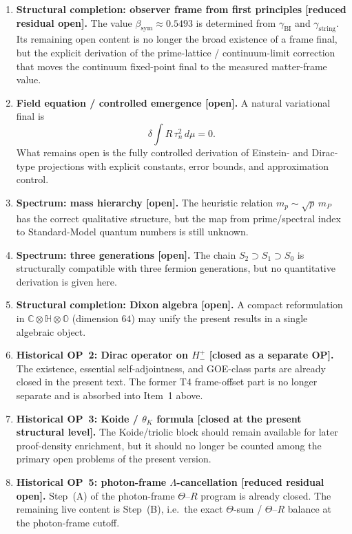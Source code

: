 \documentclass[12pt,a4paper]{article}
\newcommand{\Hplusminus}{H^+_-}
\begin{document}
\begin{enumerate}
 \item \textbf{Structural completion: observer frame from first principles}
 \textbf{[reduced residual open].}
 The value $\beta_{\mathrm{sym}} \approx 0.5493$ is determined from
 $\gamma_{\mathrm{BI}}$ and $\gamma_{\mathrm{string}}$. Its remaining
 open content is no longer the broad existence of a frame final,
 but the explicit derivation of the prime-lattice / continuum-limit
 correction that moves the continuum fixed-point final to the
 measured matter-frame value.

 \item \textbf{Field equation / controlled emergence [open].}
 A natural variational final is
 \[
 \delta \int R \, \tau_n^2 \, d\mu = 0.
 \]
 What remains open is the fully controlled derivation of Einstein- and
 Dirac-type projections with explicit constants, error bounds, and
 approximation control.

 \item \textbf{Spectrum: mass hierarchy [open].}
 The heuristic relation $m_p \sim \sqrt{p}\,m_P$ has the correct
 qualitative structure, but the map from prime/spectral index to
 Standard-Model quantum numbers is still unknown.

 \item \textbf{Spectrum: three generations [open].}
 The chain $S_2 \supset S_1 \supset S_0$ is structurally compatible
 with three fermion generations, but no quantitative derivation is
 given here.

 \item \textbf{Structural completion: Dixon algebra [open].}
 A compact reformulation in $\mathbb{C} \otimes \mathbb{H} \otimes
 \mathbb{O}$ (dimension $64$) may unify the present results in a
 single algebraic object.

 \item \textbf{Historical OP~2: Dirac operator on $\Hplusminus$ [closed as a separate OP].}
 The existence, essential self-adjointness, and GOE-class parts are
 already closed in the present text. The former T4 frame-offset part is
 no longer separate and is absorbed into Item~1 above.

 \item \textbf{Historical OP~3: Koide / $\theta_K$ formula [closed at the present structural level].}
 The Koide/triolic block should remain available for later proof-density
 enrichment, but it should no longer be counted among the primary open
 problems of the present version.

 \item \textbf{Historical OP~5: photon-frame $\Lambda$-cancellation [reduced residual open].}
 Step~(A) of the photon-frame $\Theta$--$R$ program is already closed.
 The remaining live content is Step~(B), i.e.\ the exact
 $\Theta$-sum / $\Theta$--$R$ balance at the photon-frame cutoff.
\end{enumerate}
\end{document}
